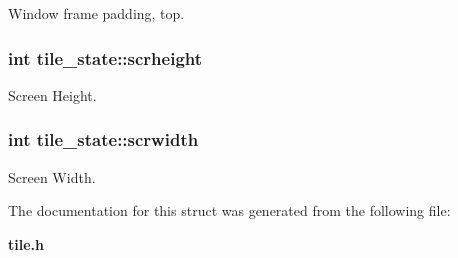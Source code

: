 Window frame padding, top. 

\subsubsection{\setlength{\rightskip}{0pt plus 5cm}int {\bf tile\_\-state::scrheight}}\label{structtile__state_o3}


Screen Height. 

\subsubsection{\setlength{\rightskip}{0pt plus 5cm}int {\bf tile\_\-state::scrwidth}}\label{structtile__state_o2}


Screen Width. 



The documentation for this struct was generated from the following file:\begin{CompactItemize}
\item 
{\bf tile.h}\end{CompactItemize}
